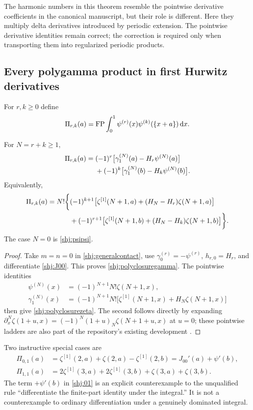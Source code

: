 The harmonic numbers in this theorem resemble the pointwise derivative coefficients in the canonical manuscript, but their role is different. Here they multiply delta derivatives introduced by periodic extension. The pointwise derivative identities remain correct; the correction is required only when transporting them into regularized periodic products.

\subsection{Every polygamma product in first Hurwitz derivatives}
For $r,k\ge0$ define
\[
\Pi_{r,k}(a)=\operatorname{FP}\int_0^1\psi^{(r)}(x)\psi^{(k)}(\{x+a\})\,\mathrm{d} x.
\]
\begin{corollary}\label{shj:polyclosure}
For $N=r+k\ge1$,
\begin{align}
\Pi_{r,k}(a)={}&(-1)^r\big[\gamma_1^{(N)}(a)-H_r\psi^{(N)}(a)\big]\notag\\
&+(-1)^k\big[\gamma_1^{(N)}(b)-H_k\psi^{(N)}(b)\big].
\label{shj:polyclosuregamma}
\end{align}
Equivalently,
\begin{align}
\Pi_{r,k}(a)=N!\bigg\{&(-1)^{k+1}\big[\zeta^{[1]}(N+1,a)
+(H_N-H_r)\zeta(N+1,a)\big]\notag\\
&+(-1)^{r+1}\big[\zeta^{[1]}(N+1,b)
+(H_N-H_k)\zeta(N+1,b)\big]\bigg\}.
\label{shj:polyclosurezeta}
\end{align}
The case $N=0$ is \eqref{shj:psipsi}.
\end{corollary}
\begin{proof}
Take $m=n=0$ in \eqref{shj:generalcontact}, use $\gamma_0^{(r)}=-\psi^{(r)}$, $h_{r,0}=H_r$, and differentiate \eqref{shj:J00}. This proves \eqref{shj:polyclosuregamma}. The pointwise identities
\begin{align*}
\psi^{(N)}(x)&=(-1)^{N+1}N!\zeta(N+1,x),\\
\gamma_1^{(N)}(x)&=(-1)^{N+1}N!
\big[\zeta^{[1]}(N+1,x)+H_N\zeta(N+1,x)\big]
\end{align*}
then give \eqref{shj:polyclosurezeta}. The second follows directly by expanding
$\partial_x^N\zeta(1+u,x)=(-1)^N(1+u)_N\zeta(N+1+u,x)$ at $u=0$; these pointwise ladders are also part of the repository's existing development \cite{shj:repo}.
\end{proof}

Two instructive special cases are
\begin{align}
\Pi_{0,1}(a)&=\zeta^{[1]}(2,a)+\zeta(2,a)-\zeta^{[1]}(2,b)
=J_{00}'(a)+\psi'(b),\label{shj:01}\\
\Pi_{1,1}(a)&=2\zeta^{[1]}(3,a)+2\zeta^{[1]}(3,b)
+\zeta(3,a)+\zeta(3,b).\label{shj:11}
\end{align}
The term $+\psi'(b)$ in \eqref{shj:01} is an explicit counterexample to the unqualified rule ``differentiate the finite-part identity under the integral.'' It is not a counterexample to ordinary differentiation under a genuinely dominated integral.

